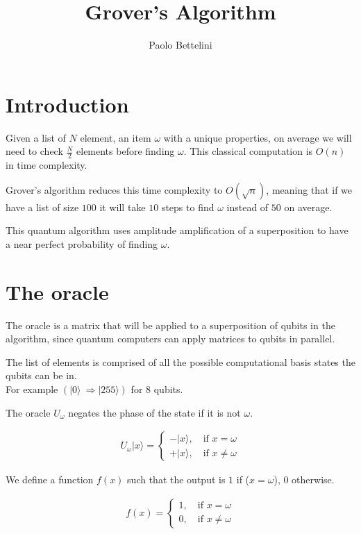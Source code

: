 \documentclass[a4paper]{article}
\title{Grover's Algorithm}
\author{Paolo Bettelini}
\date{}
\begin{document}
\maketitle
\tableofcontents
\pagebreak

\section{Introduction}

Given a list of \(N\) element, an item \(\omega\) with a unique properties, on average we will need to check \(\frac{N}{2}\) elements before finding \(\omega\).
This classical computation is \(O(n)\) in time complexity.

Grover's algorithm reduces this time complexity to \(O(\sqrt{n})\), meaning that if we have a list of size \(100\) it will take \(10\) steps to find \(\omega\) instead of \(50\) on average.

This quantum algorithm uses amplitude amplification of a superposition to have a near perfect probability of finding \(\omega\).

\pagebreak

\section{The oracle}

The oracle is a matrix that will be applied to a superposition of qubits in the algorithm, since quantum computers can apply matrices to qubits in parallel.

The list of elements is comprised of all the possible computational basis states the qubits can be in.\\
For example \((|0\rangle\ \Rightarrow |255\rangle)\) for 8 qubits.

The oracle \(U_\omega\) negates the phase of the state if it is not \(\omega\).

\begin{align*}
    U_\omega|x\rangle=
    \begin{cases}
        -|x\rangle,\quad \text{if } x=\omega \\
        +|x\rangle,\quad \text{if } x\neq\omega
    \end{cases}
\end{align*}

We define a function \(f(x)\) such that the output is \(1\) if (\(x=\omega\)), \(0\) otherwise.

\begin{align*}
    f(x)=
    \begin{cases}
        1,\quad \text{if } x=\omega \\
        0,\quad \text{if } x\neq\omega
    \end{cases}
\end{align*}
\end{document}

